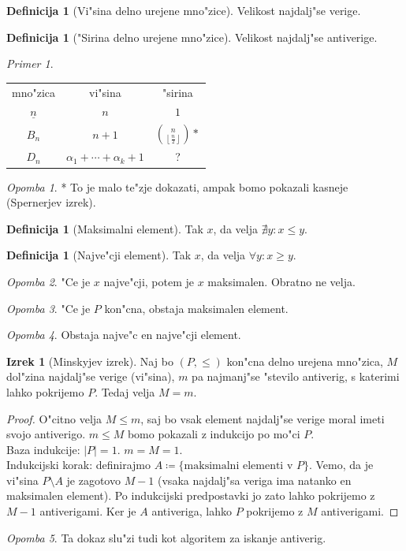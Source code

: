 \documentclass[a4paper,12pt]{article}
\theoremstyle{definition}
\newtheorem{defn}[counter]{Definicija}
\newtheorem{theorem}[counter]{Izrek}
\theoremstyle{remark}
\newtheorem*{ex}{Primer}
\newtheorem*{rem}{Opomba}
\begin{document}
\begin{defn}[Vi"sina delno urejene mno"zice]
	Velikost najdalj"se verige.
\end{defn}
\begin{defn}["Sirina delno urejene mno"zice]
	Velikost najdalj"se antiverige.
\end{defn}
\begin{ex}
	\begin{tabular}{ccc}
		mno"zica & vi"sina & "sirina \\
		$\underline{n}$ & $n$ & $1$ \\
		$B_n$ & $n+1$ & $\binom{n}{\left\lfloor \frac{n}{2} \right\rfloor}*$ \\
		$D_n$ & $\alpha_1 + \cdots + \alpha_k + 1$ & ?\\
	\end{tabular}
\end{ex}
\begin{rem}
	* To je malo te"zje dokazati, ampak bomo pokazali kasneje (Spernerjev izrek).
\end{rem}
\begin{defn}[Maksimalni element]
	Tak $x$, da velja $\nexists y: x \leqslant y$.
\end{defn}
\begin{defn}[Najve"cji element]
	Tak $x$, da velja $\forall y: x \geqslant y$.
\end{defn}
\begin{rem}
	"Ce je $x$ najve"cji, potem je $x$ maksimalen. Obratno ne velja.
\end{rem}
\begin{rem}
	"Ce je $P$ kon"cna, obstaja maksimalen element.
\end{rem}
\begin{rem}
	Obstaja najve"c en najve"cji element.
\end{rem}

\begin{theorem}[Minskyjev izrek]
	Naj bo $(P, \leqslant)$ kon"cna delno urejena mno"zica, $M$ dol"zina najdalj"se verige (vi"sina), $m$ pa najmanj"se "stevilo antiverig, s katerimi lahko pokrijemo $P$. Tedaj velja $M = m$.
\end{theorem}
\begin{proof}
	O"citno velja $M \leqslant m$, saj bo vsak element najdalj"se verige moral imeti svojo antiverigo. $m \leqslant M$ bomo pokazali z indukcijo po mo"ci $P$.\\
	Baza indukcije: $|P| = 1$. $m = M = 1$.\\
	Indukcijski korak: definirajmo $A \coloneqq \{\text{maksimalni elementi v }P\}$. Vemo, da je vi"sina $P \setminus A$ je zagotovo $M-1$ (vsaka najdalj"sa veriga ima natanko en maksimalen element). Po indukcijski predpostavki jo zato lahko pokrijemo z $M-1$ antiverigami. Ker je $A$ antiveriga, lahko $P$ pokrijemo z $M$ antiverigami.
\end{proof}
\begin{rem}
	Ta dokaz slu"zi tudi kot algoritem za iskanje antiverig.
\end{rem}
\end{document}
